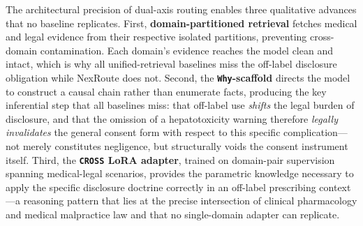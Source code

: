 \documentclass[a4paper,fleql]{cas-sc}
\begin{document}
The architectural precision of dual-axis routing enables three qualitative
advances that no baseline replicates. First, \textbf{domain-partitioned retrieval} fetches medical and legal
evidence from their respective isolated partitions, preventing cross-domain
contamination. Each domain's evidence reaches the model clean and intact,
which is why all unified-retrieval baselines miss the off-label disclosure
obligation while NexRoute does not. Second, the \textbf{\texttt{Why}-scaffold} directs the
model to construct a causal chain rather than enumerate facts, producing the
key inferential step that all baselines miss: that off-label use \emph{shifts}
the legal burden of disclosure, and that the omission of a hepatotoxicity
warning therefore \emph{legally invalidates} the general consent form with
respect to this specific complication---not merely constitutes negligence, but
structurally voids the consent instrument itself. Third, the
\textbf{\texttt{CROSS} LoRA adapter}, trained on domain-pair supervision
spanning medical-legal scenarios, provides the parametric knowledge necessary
to apply the specific disclosure doctrine correctly in an off-label prescribing
context---a reasoning pattern that lies at the precise intersection of clinical
pharmacology and medical malpractice law and that no single-domain adapter can
replicate.

\end{document}
